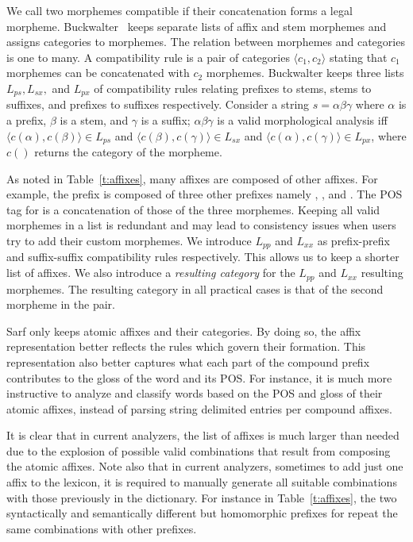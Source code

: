 \documentclass[a4,12pt]{report}
\newcommand{\noVocRL}[1]{\transtrue\novocalize\RL{#1}\vocalize}
\begin{document}
We call two morphemes compatible if their concatenation
forms a legal morpheme. 
Buckwalter~\cite{Buckwalter:02} keeps separate lists 
of affix and stem morphemes and assigns categories to
morphemes. 
The relation between morphemes and categories is one 
to many. 
A compatibility rule is a pair of categories 
$\langle c_1, c_2\rangle$  stating that $c_1$ morphemes
can be concatenated with $c_2$ morphemes.
Buckwalter keeps three lists $L_{ps}, L_{sx},$ and $L_{px}$ 
of compatibility rules relating
prefixes to stems, stems to suffixes, and prefixes to suffixes
respectively. 
Consider a string $s=\alpha\beta\gamma$ where $\alpha$ is 
a prefix, $\beta$ is a stem, and $\gamma$ is a suffix;
$\alpha\beta\gamma$ is a 
valid morphological analysis iff
$\langle c(\alpha),c(\beta)\rangle \in L_{ps}$ and
$\langle c(\beta),c(\gamma)\rangle \in L_{sx}$ and
$\langle c(\alpha),c(\gamma)\rangle \in L_{px}$, where
$c()$ returns the category of the morpheme.

As noted in Table~\ref{t:affixes}, many affixes are composed of other affixes. For example,
the prefix \noVocRL{wsy} is composed of three other prefixes
namely \noVocRL{w}, \noVocRL{s}, and \noVocRL{y}.
The POS tag for \noVocRL{wsy} is a concatenation
of those of the three morphemes. 
Keeping all valid morphemes in a list
is redundant and may lead to consistency issues when
users try to add their custom morphemes.
We introduce $L_{pp}$ and
$L_{xx}$ as prefix-prefix and suffix-suffix 
compatibility rules respectively.
This allows us to keep a shorter list of affixes. 
We also introduce a {\em resulting category}
for the $L_{pp}$ and  $L_{xx}$ resulting morphemes.
The resulting category in all practical cases
is that of the second morpheme in the pair. 

Sarf only keeps atomic affixes and their categories.
By doing so, the affix representation better reflects the rules
which govern their formation. This representation also better captures what each part of the compound prefix
contributes to the gloss of the word and its POS. For instance, it is much more instructive to analyze
and classify words based on the POS and gloss of their atomic affixes, instead of parsing string
delimited entries per compound affixes. 

It is clear that in current analyzers, the list of affixes is much larger than needed
due to the explosion of possible valid combinations that result from composing the atomic 
affixes. Note also that in current analyzers, sometimes to add just one affix to the lexicon, it is required to
manually generate all suitable combinations with those previously in the dictionary.
For instance in Table~\ref{t:affixes}, the two syntactically and semantically different but homomorphic prefixes for 
repeat the same combinations with other prefixes.
\end{document}
